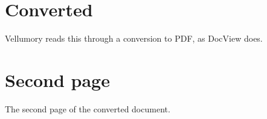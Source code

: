 \documentclass{article}
\begin{document}
\section{Converted}
Vellumory reads this through a conversion to PDF, as DocView does.
\newpage
\section{Second page}
The second page of the converted document.
\end{document}
